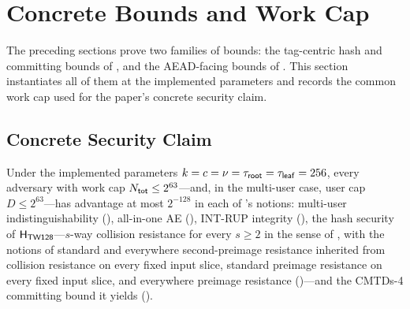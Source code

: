 \section{Concrete Bounds and Work Cap}
\label{sec:concrete-security}

The preceding sections prove two families of bounds: the tag-centric hash and
committing bounds of , and the AEAD-facing
bounds of . This section instantiates all of them at
the implemented \TW{} parameters and records the common work cap used for the
paper's concrete security claim.

\subsection{Concrete Security Claim}
\label{sec:concrete-claim}

\begin{corollary}
\label{cor:concrete-security}
Under the implemented parameters $k = c = \nu = \tau_{\mathsf{root}} = \tau_{\mathsf{leaf}} = 256$, every
adversary with work cap $N_{\mathsf{tot}} \leq 2^{63}$---and, in the multi-user case,
user cap $D \leq 2^{63}$---has advantage at most $2^{-128}$ in each of
\TW{}'s notions: multi-user indistinguishability (),
all-in-one AE (), \textsf{INT-RUP} integrity
(), the hash security of
$\mathsf{H}_{\mathsf{TW128}}$---$s$-way collision resistance for every $s \geq 2$ in the sense
of \cite{BH22}, with the \cite{RS04} notions of standard and everywhere
second-preimage resistance inherited from collision resistance on every
fixed input slice, standard preimage resistance on every fixed input
slice, and everywhere preimage resistance
()---and the \cite{BH22}
CMTDs-4 committing bound it yields ().
\end{corollary}

